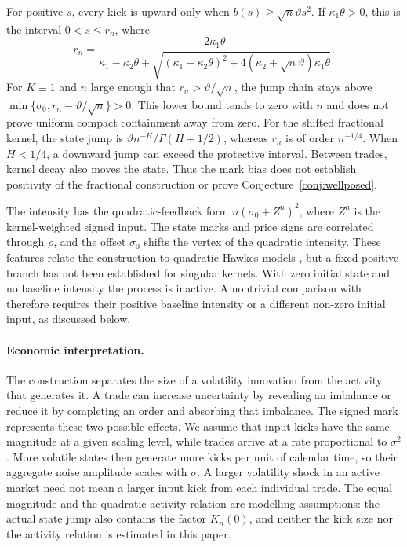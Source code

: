 \documentclass{rQUF2e}
\theoremstyle{plain}
\theoremstyle{definition}
\theoremstyle{remark}
\begin{document}
For positive $s$, every kick is upward only when $b(s)\ge\sqrt n\vartheta s^2$. If $\kappa_1\theta>0$, this is the interval $0<s\le r_n$, where
\begin{equation*}
r_n=\frac{2\kappa_1\theta}{\kappa_1-\kappa_2\theta+\sqrt{(\kappa_1-\kappa_2\theta)^2+4(\kappa_2+\sqrt n\vartheta)\kappa_1\theta}}.
\end{equation*}
For $K\equiv1$ and $n$ large enough that $r_n>\vartheta/\sqrt n$, the jump chain stays above $\min\{\sigma_0,r_n-\vartheta/\sqrt n\}>0$. This lower bound tends to zero with $n$ and does not prove uniform compact containment away from zero. For the shifted fractional kernel, the state jump is $\vartheta n^{-H}/\Gamma(H+1/2)$, whereas $r_n$ is of order $n^{-1/4}$. When $H<1/4$, a downward jump can exceed the protective interval. Between trades, kernel decay also moves the state. Thus the mark bias does not establish positivity of the fractional construction or prove Conjecture~\ref{conj:wellposed}.

The intensity has the quadratic-feedback form $n(\sigma_0+Z^n)^2$, where $Z^n$ is the kernel-weighted signed input. The state marks and price signs are correlated through $\rho$, and the offset $\sigma_0$ shifts the vertex of the quadratic intensity. These features relate the construction to quadratic Hawkes models \citep{BlancDonierBouchaud2017}, but a fixed positive branch has not been established for singular kernels. With zero initial state and no baseline intensity the process is inactive. A nontrivial comparison with \citet{DandapaniJusselinRosenbaum2021} therefore requires their positive baseline intensity or a different non-zero initial input, as discussed below.

\paragraph{Economic interpretation.}
The construction separates the size of a volatility innovation from the activity that generates it. A trade can increase uncertainty by revealing an imbalance or reduce it by completing an order and absorbing that imbalance. The signed mark represents these two possible effects. We assume that input kicks have the same magnitude at a given scaling level, while trades arrive at a rate proportional to $\sigma^2$. More volatile states then generate more kicks per unit of calendar time, so their aggregate noise amplitude scales with $\sigma$. A larger volatility shock in an active market need not mean a larger input kick from each individual trade. The equal magnitude and the quadratic activity relation are modelling assumptions: the actual state jump also contains the factor $K_n(0)$, and neither the kick size nor the activity relation is estimated in this paper.
\end{document}
